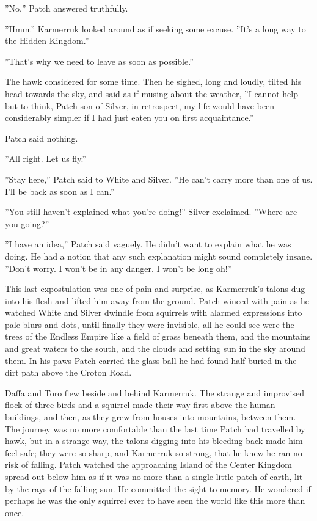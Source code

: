 \documentclass[12pt]{book}
\begin{document}
''No,'' Patch answered truthfully.

''Hmm.'' Karmerruk looked around as if seeking some excuse. ''It's a long way to the Hidden Kingdom.''

''That's why we need to leave as soon as possible.''

The hawk considered for some time. Then he sighed, long and loudly, tilted his head towards the sky, and said as if musing about the weather, ''I cannot help but to think, Patch son of Silver, in retrospect, my life would have been considerably simpler if I had just eaten you on first acquaintance.''

Patch said nothing.

''All right. Let us fly.''

''Stay here,'' Patch said to White and Silver. ''He can't carry more than one of us. I'll be back as soon as I can.''

''You still haven't explained what you're doing!'' Silver exclaimed. ''Where are you going?''

''I have an idea,'' Patch said vaguely. He didn't want to explain what he was doing. He had a notion that any such explanation might sound completely insane. ''Don't worry. I won't be in any danger. I won't be long %
oh!''

This last expostulation was one of pain and surprise, as Karmerruk's talons dug into his flesh and lifted him away from the ground. Patch winced with pain as he watched White and Silver dwindle from squirrels with alarmed expressions into pale blurs and dots, until finally they were invisible, all he could see were the trees of the Endless Empire like a field of grass beneath them, and the mountains and great waters to the south, and the clouds and setting sun in the sky around them. In his paws Patch carried the glass ball he had found half-buried in the dirt path above the Croton Road.

Daffa and Toro flew beside and behind Karmerruk. The strange and improvised flock of three birds and a squirrel made their way first above the human buildings, and then, as they grew from houses into mountains, between them. The journey was no more comfortable than the last time Patch had travelled by hawk, but in a strange way, the talons digging into his bleeding back made him feel safe; they were so sharp, and Karmerruk so strong, that he knew he ran no risk of falling. Patch watched the approaching Island of the Center Kingdom spread out below him as if it was no more than a single little patch of earth, lit by the rays of the falling sun. He committed the sight to memory. He wondered if perhaps he was the only squirrel ever to have seen the world like this more than once.
\end{document}
